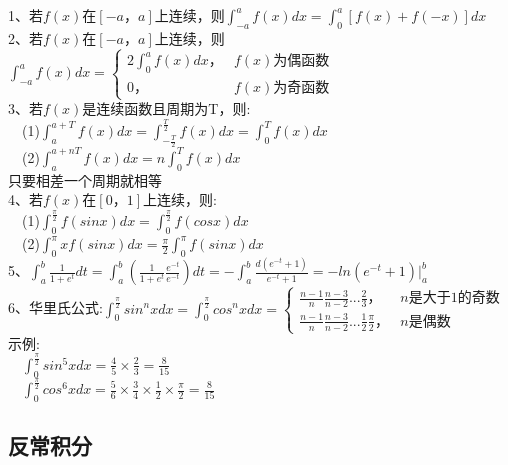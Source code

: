 \documentclass{article}
\begin{document}
\begin{flushleft}
	1、若$f(x)$在$[-a，a]$上连续，则$\int_{-a}^{a}f(x)dx=\int_{0}^{a}[f(x)+f(-x)]dx$\\
	2、若$f(x)$在$[-a，a]$上连续，则$\int_{-a}^{a}f(x)dx=\left\{
	\begin{array}{lcl}
	2\int_{0}^{a}f(x)dx， & f(x)\mbox{为偶函数}\\
	0， & f(x)\mbox{为奇函数}
	\end{array} \right.$\\
	3、若$f(x)$是连续函数且周期为T，则:\\
	\ \ (1)$\int_{a}^{a+T}f(x)dx=\int_{-\frac{T}{2}}^{\frac{T}{2}}f(x)dx=\int_{0}^{T}f(x)dx$\\
	\ \ (2)$\int_{a}^{a+nT}f(x)dx=n\int_{0}^{T}f(x)dx$\\
	只要相差一个周期就相等\\
	4、若$f(x)$在$[0，1]$上连续，则:\\
	\ \ (1)$\int_{0}^{\frac{\pi}{2}}f(sinx)dx=\int_{0}^{\frac{\pi}{2}}f(cosx)dx$\\
	\ \ (2)$\int_{0}^{\pi}xf(sinx)dx=\frac{\pi}{2}\int_{0}^{\pi}f(sinx)dx$\\
	5、$\int_{a}^{b}\frac{1}{1+e^t}dt=\int_{a}^{b}(\frac{1}{1+e^t}\frac{e^{-t}}{e^{-t}})dt=-\int_{a}^{b}\frac{d(e^{-t}+1)}{e^{-t}+1}=-ln(e^{-t}+1)|_a^b$\\
	6、华里氏公式:$\int_{0}^{\frac{\pi}{2}}sin^nxdx=\int_{0}^{\frac{\pi}{2}}cos^nxdx=\left\{
	\begin{array}{lcl}
	\frac{n-1}{n}\frac{n-3}{n-2}...\frac{2}{3}， & n\mbox{是大于1的奇数}\\
	\frac{n-1}{n}\frac{n-3}{n-2}...\frac{1}{2}\frac{\pi}{2}， & n\mbox{是偶数}
	\end{array} \right.$\\
	示例:\\
	\ \ $\int_{0}^{\frac{\pi}{2}}sin^5xdx=\frac{4}{5}\times\frac{2}{3}=\frac{8}{15}$\\
	\ \ $\int_{0}^{\frac{\pi}{2}}cos^6xdx=\frac{5}{6}\times\frac{3}{4}\times\frac{1}{2}\times\frac{\pi}{2}=\frac{8}{15}$\\
	
	\subsection{反常积分}
	

\end{flushleft}
\end{document}
